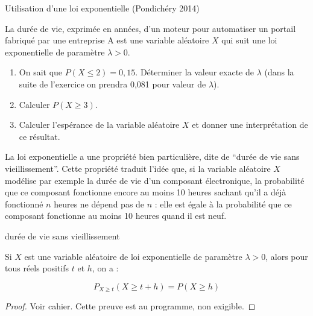 \begin{methode}{Utilisation d'une loi exponentielle (Pondichéry 2014)}

La durée de vie, exprimée en années, d'un moteur pour automatiser un
portail fabriqué par une entreprise A est une variable aléatoire \(X\)
qui suit une loi exponentielle de paramètre \(\lambda>0\).

\begin{enumerate}
\def\labelenumi{\arabic{enumi}.}
\itemsep1pt\parskip0pt
\item
  On sait que \(P(X\leqslant 2)=0,15\). Déterminer la valeur exacte de
  \(\lambda\) (dans la suite de l'exercice on prendra 0,081 pour valeur
  de \(\lambda\)).
\item
  Calculer \(P(X\geqslant 3)\).
\item
  Calculer l'espérance de la variable aléatoire \(X\) et donner une
  interprétation de ce résultat.
\end{enumerate}

\end{methode}

\vspace{.5cm}

La loi exponentielle a une propriété bien particulière, dite de ``durée
de vie sans vieillissement''. Cette propriété traduit l'idée que, si la
variable aléatoire \(X\) modélise par exemple la durée de vie d'un
composant électronique, la probabilité que ce composant fonctionne
encore au moins 10 heures sachant qu'il a déjà fonctionné $n$ heures ne
dépend pas de \(n\) : elle est égale à la probabilité que ce composant
fonctionne au moins 10 heures quand il est neuf.

\vspace{.5cm}

\begin{theoreme}{durée de vie sans vieillissement}

Si \(X\) est une variable aléatoire de loi exponentielle de paramètre
\(\lambda>0\), alors pour tous réels positifs \(t\) et \(h\), on a :

\[P_{X\geqslant t}(X\geqslant t+h)=P(X\geqslant h)\]

\end{theoreme}

\begin{proof}
 Voir cahier. Cette preuve est au programme, non
exigible.
\end{proof}

\vspace{.5cm}

